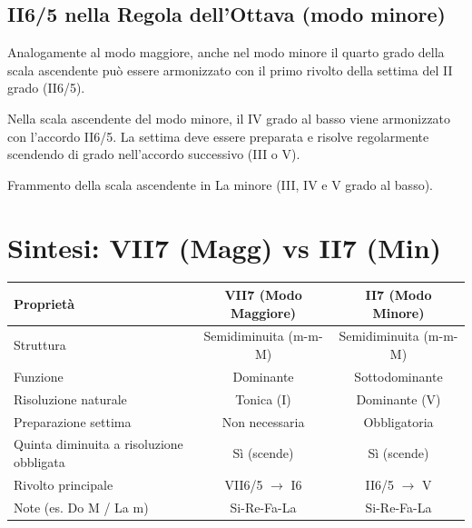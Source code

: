 \subsection{II6/5 nella Regola dell'Ottava (modo minore)}
\label{subsec:ii7_regola_minore}

Analogamente al modo maggiore, anche nel modo minore il quarto grado della scala ascendente può essere armonizzato con il primo rivolto della settima del II grado (II6/5).

\begin{regola}
	\label{reg:ii65_regola_minore}
	Nella scala ascendente del modo minore, il IV grado al basso viene armonizzato con l'accordo II6/5. La settima deve essere preparata e risolve regolarmente scendendo di grado nell'accordo successivo (III o V).
\end{regola}

\begin{esempio}
	\label{ex:ii65_regola_minore}
	Frammento della scala ascendente in La minore (III, IV e V grado al basso).
\end{esempio}

\section{Sintesi: VII7 (Magg) vs II7 (Min)}
\label{sec:sintesi_vii_ii}

\begin{center}
	\begin{tabular}{|l|c|c|}
		\hline
		\textbf{Proprietà} & \textbf{VII7 (Modo Maggiore)} & \textbf{II7 (Modo Minore)} \\
		\hline
		Struttura & Semidiminuita (m-m-M) & Semidiminuita (m-m-M) \\
		Funzione & Dominante & Sottodominante \\
		Risoluzione naturale & Tonica (I) & Dominante (V) \\
		Preparazione settima & Non necessaria & Obbligatoria \\
		Quinta diminuita a risoluzione obbligata & Sì (scende) & Sì (scende) \\
		Rivolto principale & VII6/5 $\rightarrow$ I6 & II6/5 $\rightarrow$ V \\
		Note (es. Do M / La m) & Si-Re-Fa-La & Si-Re-Fa-La \\
		\hline
	\end{tabular}
\end{center}
